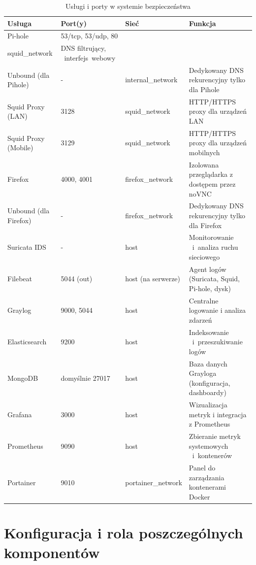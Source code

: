 \documentclass[
    left=2.5cm,         %
    right=2.5cm,        %
    top=2.5cm,          %
    bottom=3cm,         %
    bindingoffset=6mm,  %
    nohyphenation=true %
]{eiti/eiti-thesis} %
\begin{document}
\newpage
\begin{table}[H]
\centering
\caption{Usługi i porty w systemie bezpieczeństwa}
\label{tab:services-overview}
\begin{tabularx}{\textwidth}{|l|l|l|X|}
\hline
\textbf{Usługa} & \textbf{Port(y)} & \textbf{Sieć} & \textbf{Funkcja} \\
\hline
Pi-hole & 53/tcp, 53/udp, 80 & \begin{tabular}{@{}l@{}}internal\_network \\ squid\_network\end{tabular} & DNS filtrujący, ~interfejs~webowy \\
\hline
Unbound (dla Pihole) & - & internal\_network & Dedykowany DNS rekurencyjny tylko dla Pihole \\
\hline
Squid Proxy (LAN) & 3128 & squid\_network\ & HTTP/HTTPS proxy dla urządzeń LAN \\
\hline
Squid Proxy (Mobile) & 3129 & squid\_network\ & HTTP/HTTPS proxy dla urządzeń mobilnych \\
\hline
Firefox & 4000, 4001 & firefox\_network & Izolowana przeglądarka z dostępem przez noVNC \\
\hline
Unbound (dla Firefox) & - & firefox\_network & Dedykowany DNS rekurencyjny tylko dla Firefox \\
\hline
Suricata IDS & - & host & Monitorowanie ~i~analiza ruchu sieciowego \\
\hline
Filebeat & 5044 (out) & host (na serwerze) & Agent logów (Suricata, Squid, Pi-hole, dysk) \\
\hline
Graylog & 9000, 5044 & host & Centralne logowanie i analiza zdarzeń \\
\hline
Elasticsearch & 9200 & host & Indeksowanie ~i~przeszukiwanie logów \\
\hline
MongoDB & domyślnie 27017 & host & Baza danych Grayloga (konfiguracja, dashboardy) \\
\hline
Grafana & 3000 & host & Wizualizacja metryk i integracja z Prometheus \\
\hline
Prometheus & 9090 & host & Zbieranie metryk systemowych ~i~kontenerów \\
\hline
Portainer & 9010 & portainer\_network & Panel do zarządzania kontenerami Docker \\
\hline
\end{tabularx}
\end{table}


\newpage 
\section{Konfiguracja i rola poszczególnych komponentów}
\end{document}
